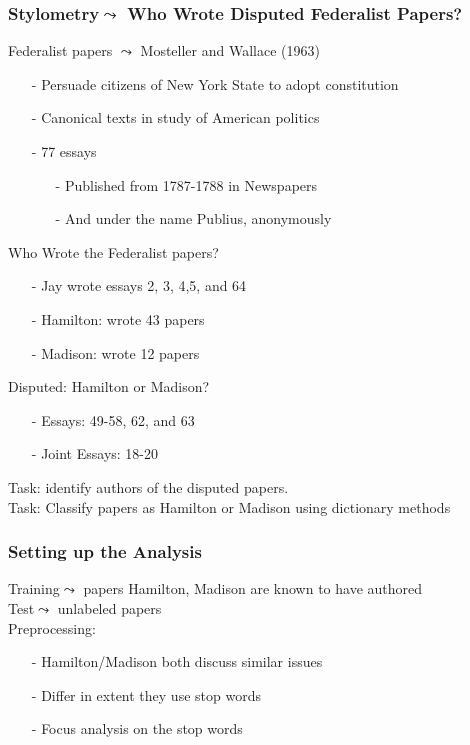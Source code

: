 \documentclass{beamer}
\numberwithin{equation}{section}
\begin{document}
\begin{frame}
\frametitle{Stylometry$\leadsto$ Who Wrote Disputed Federalist Papers?}


Federalist papers $\leadsto$ Mosteller and Wallace (1963)
\begin{itemize}
\item[-] Persuade citizens of New York State to adopt constitution
\item[-] Canonical texts in study of American politics
\item[-] 77 essays 
\begin{itemize}
\item[-] Published from 1787-1788 in Newspapers
\item[-] And under the name \alert{Publius}, anonymously
\end{itemize}
\end{itemize}
\alert{Who Wrote the Federalist papers}?
\begin{itemize}
\item[-] Jay wrote essays 2, 3, 4,5, and 64
\item[-] Hamilton: wrote 43 papers
\item[-] Madison: wrote 12 papers
\end{itemize}
\alert{Disputed:} Hamilton or Madison?
\begin{itemize}
\item[-] Essays: 49-58, 62, and 63
\item[-] Joint Essays: 18-20
\end{itemize}
\alert{Task}: identify authors of the disputed papers.  \\
\alert{Task}: Classify papers as Hamilton or Madison using dictionary methods

\end{frame}


\begin{frame}
\frametitle{Setting up the Analysis}


\alert{Training}$\leadsto$ papers Hamilton, Madison are known to have authored\\
\alert{Test}$\leadsto$ unlabeled papers\\
\alert{Preprocessing}:
\begin{itemize}
\item[-] Hamilton/Madison both discuss similar issues
\item[-] Differ in extent they use \alert{stop words}
\item[-] Focus analysis on the stop words
\end{itemize}


\end{frame}
\end{document}

